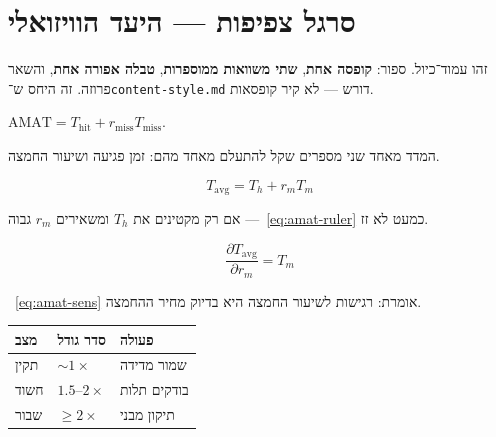 %
%



\chapter*{סרגל צפיפות — היעד הוויזואלי}
\setcounter{chapter}{1}

\noindent זהו עמוד־כיול. ספור: \textbf{קופסה אחת}, \textbf{שתי משוואות ממוספרות},
\textbf{טבלה אפורה אחת}, והשאר פרוזה. זה היחס ש־\texttt{content-style.md} דורש —
לא קיר קופסאות.

\begin{defbox}[frametitle={הגדרה — זמן גישה ממוצע}]
$\mathrm{AMAT}=T_{\mathrm{hit}}+r_{\mathrm{miss}}T_{\mathrm{miss}}$.
\end{defbox}

המדד מאחד שני מספרים שקל להתעלם מאחד מהם: זמן פגיעה ושיעור החמצה.

\begin{equation}
\label{eq:amat-ruler}
T_{\mathrm{avg}}=T_h+r_m T_m
\end{equation}

אם רק מקטינים את $T_h$ ומשאירים $r_m$ גבוה —~\eqref{eq:amat-ruler} כמעט לא זז.

\begin{equation}
\label{eq:amat-sens}
\frac{\partial T_{\mathrm{avg}}}{\partial r_m}=T_m
\end{equation}

~\eqref{eq:amat-sens} אומרת: רגישות לשיעור החמצה היא בדיוק מחיר ההחמצה.

\begin{tablebox}\centering\small
\begin{tabular}{@{}lll@{}}
\toprule
\textbf{מצב} & \textbf{סדר גודל} & \textbf{פעולה}\\
\midrule
תקין & $\sim 1\times$ & שמור מדידה\\
חשוד & $1.5$–$2\times$ & בודקים תלות\\
שבור & $\ge 2\times$ & תיקון מבני\\
\bottomrule
\end{tabular}
\end{tablebox}

